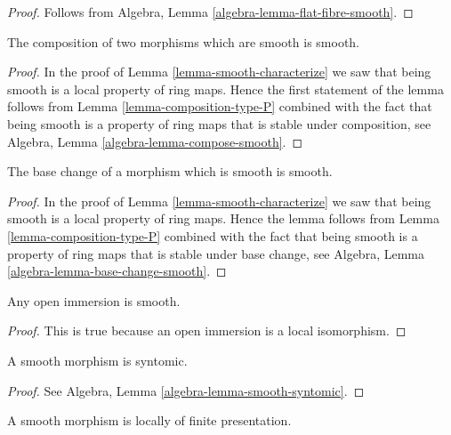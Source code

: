 \begin{proof}
Follows from Algebra, Lemma \ref{algebra-lemma-flat-fibre-smooth}.
\end{proof}

\begin{lemma}
\label{lemma-composition-smooth}
The composition of two morphisms which are smooth is smooth.
\end{lemma}

\begin{proof}
In the proof of Lemma \ref{lemma-smooth-characterize}
we saw that being smooth is a local property of ring maps.
Hence the first statement of the lemma follows from
Lemma \ref{lemma-composition-type-P} combined
with the fact that being smooth is a property of ring maps that is
stable under composition, see
Algebra, Lemma \ref{algebra-lemma-compose-smooth}.
\end{proof}

\begin{lemma}
\label{lemma-base-change-smooth}
The base change of a morphism which is smooth is smooth.
\end{lemma}

\begin{proof}
In the proof of Lemma \ref{lemma-smooth-characterize}
we saw that being smooth is a local property of ring maps.
Hence the lemma follows from
Lemma \ref{lemma-composition-type-P} combined
with the fact that being smooth is a property of ring maps that is
stable under base change, see
Algebra, Lemma \ref{algebra-lemma-base-change-smooth}.
\end{proof}

\begin{lemma}
\label{lemma-open-immersion-smooth}
Any open immersion is smooth.
\end{lemma}

\begin{proof}
This is true because an open immersion is a local isomorphism.
\end{proof}

\begin{lemma}
\label{lemma-smooth-syntomic}
A smooth morphism is syntomic.
\end{lemma}

\begin{proof}
See Algebra, Lemma \ref{algebra-lemma-smooth-syntomic}.
\end{proof}

\begin{lemma}
\label{lemma-smooth-locally-finite-presentation}
A smooth morphism is locally of finite presentation.
\end{lemma}

